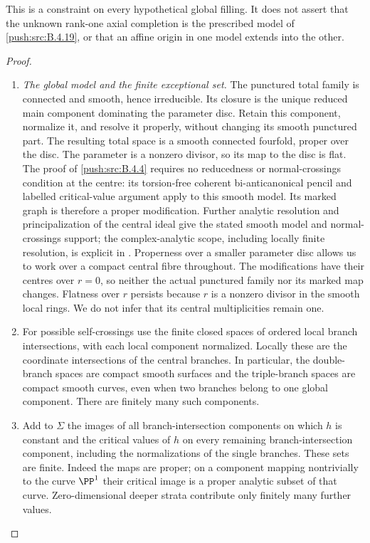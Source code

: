 \begin{proposition}
This is a constraint on every hypothetical global filling. It
does not assert that the unknown rank-one axial completion is
the prescribed model of \ref{push:src:B.4.19}, or that an affine origin in one
model extends into the other.
\end{proposition}


\begin{proof}
\begin{enumerate}[label=\arabic*.,leftmargin=*]
\item \emph{The global model and the finite exceptional set.}
The punctured total family is connected and smooth, hence
irreducible. Its closure is the unique reduced main component
dominating the parameter disc. Retain this component, normalize
it, and resolve it properly, without changing its smooth
punctured part. The resulting total space is a smooth connected
fourfold, proper over the disc. The parameter is a nonzero
divisor, so its map to the disc is flat. The proof of \ref{push:src:B.4.4}
requires no reducedness or normal-crossings condition at the
centre: its torsion-free coherent bi-anticanonical pencil and
labelled critical-value argument apply to this smooth model.
Its marked graph is therefore a proper modification.
Further analytic resolution and principalization of the central
ideal give the stated smooth
model and normal-crossings support; the complex-analytic scope,
including locally finite resolution, is explicit in
\citet[Theorems 1.6 and 1.10 and the paragraph following
Theorem 1.6]{BM95AB}. Properness over a smaller parameter disc
allows us to work over a compact central fibre throughout.
The modifications have their centres over $r=0$, so neither
the actual punctured family nor its marked map changes.
Flatness over $r$ persists because $r$ is a nonzero divisor in
the smooth local rings. We do not infer that its central
multiplicities remain one.

\item For possible self-crossings use the finite closed spaces of
ordered local branch intersections, with each local component
normalized. Locally these are the coordinate intersections of
the central branches. In particular, the double-branch spaces
are compact smooth surfaces and the triple-branch spaces are
compact smooth curves, even when two branches belong to one
global component. There are finitely many such components.

\item Add to $\Sigma$ the images of all branch-intersection components
on which $h$ is constant and the critical values of $h$ on every
remaining branch-intersection component, including the
normalizations of the single branches. These sets are finite.
Indeed the maps are proper; on a component mapping nontrivially
to the curve $\PP^1$ their critical image is a proper analytic
subset of that curve. Zero-dimensional deeper strata contribute
only finitely many further values.


\end{enumerate}
\end{proof}
